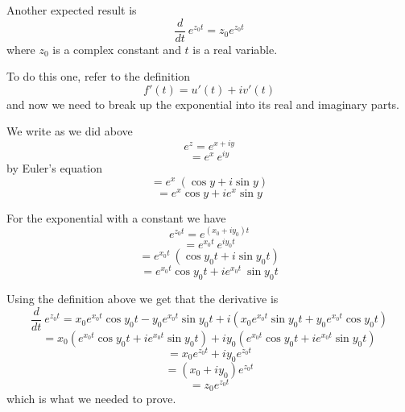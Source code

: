\documentclass[11pt, oneside]{article}   	%
\begin{document}
Another expected result is
\[ \frac{d}{dt} \ e^{z_0 t} = z_0 e^{z_0 t} \]
where $z_0$ is a complex constant and $t$ is a real variable.

To do this one, refer to the definition
\[ f'(t) = u'(t) + i v'(t) \]
and now we need to break up the exponential into its real and imaginary parts.  

We write as we did above
\[ e^z = e^{x + iy} \]
\[ = e^x \ e^{iy} \]
by Euler's equation
\[ = e^x \ (\cos y + i \sin y) \]
\[ = e^x \cos y + i e^x \sin y \]

For the exponential with a constant we have
\[ e^{z_0 t} = e^{(x_0 + iy_0) t} \]
\[ = e^{x_0t} \ e^{i y_0 t} \]
\[ = e^{x_0t} \ (\cos y_0 t + i \sin y_0 t) \]
\[ = e^{x_0t} \cos y_0 t + i e^{x_0t} \ \sin y_0 t \]

Using the definition above we get that the derivative is
\[ \frac{d}{dt} \ e^{z_0 t} = x_0 e^{x_0t} \cos y_0 t  - y_0 e^{x_0t} \sin y_0 t + i(x_0 e^{x_0t} \sin y_0 t + y_0 e^{x_0t} \cos y_0 t) \]
\[ = x_0(e^{x_0t} \cos y_0 t + i e^{x_0 t} \sin y_0 t) + i y_0(e^{x_0t} \cos y_0 t + i e^{x_0 t} \sin y_0 t) \]
\[ = x_0 e^{z_0 t} + i y_0 e^{z_0 t} \]
\[ = (x_0 + iy_0) e^{z_0 t} \]
\[ = z_0 e^{z_0 t} \]
which is what we needed to prove.
\end{document}
